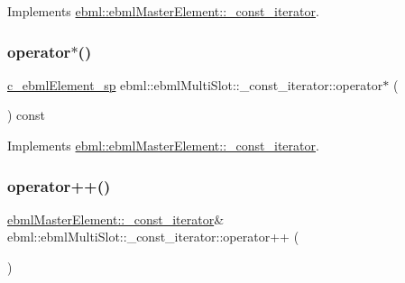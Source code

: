 Implements \mbox{\hyperlink{classebml_1_1ebmlMasterElement_1_1__const__iterator_ac62d190e9da49236835f8219ec307d22}{ebml\+::ebml\+Master\+Element\+::\+\_\+const\+\_\+iterator}}.

\mbox{\label{classebml_1_1ebmlMultiSlot_1_1__const__iterator_ad4dfa7a3f08d535fe83c93c762009483}} 
\subsubsection{\texorpdfstring{operator$\ast$()}{operator*()}}
{\footnotesize\ttfamily \mbox{\hyperlink{namespaceebml_a2deef4e8071531b32e3533f1bf978917}{c\+\_\+ebml\+Element\+\_\+sp}} ebml\+::ebml\+Multi\+Slot\+::\+\_\+const\+\_\+iterator\+::operator$\ast$ (\begin{DoxyParamCaption}{ }\end{DoxyParamCaption}) const\hspace{0.3cm}{\ttfamily [virtual]}}



Implements \mbox{\hyperlink{classebml_1_1ebmlMasterElement_1_1__const__iterator_aa3e5459826695a9043745fbbaea9cd47}{ebml\+::ebml\+Master\+Element\+::\+\_\+const\+\_\+iterator}}.

\mbox{\label{classebml_1_1ebmlMultiSlot_1_1__const__iterator_a4d9425007a96cb4803ef3cff5bf88e00}} 
\subsubsection{\texorpdfstring{operator++()}{operator++()}}
{\footnotesize\ttfamily \mbox{\hyperlink{classebml_1_1ebmlMasterElement_1_1__const__iterator}{ebml\+Master\+Element\+::\+\_\+const\+\_\+iterator}}\& ebml\+::ebml\+Multi\+Slot\+::\+\_\+const\+\_\+iterator\+::operator++ (\begin{DoxyParamCaption}{ }\end{DoxyParamCaption})\hspace{0.3cm}{\ttfamily [virtual]}}



